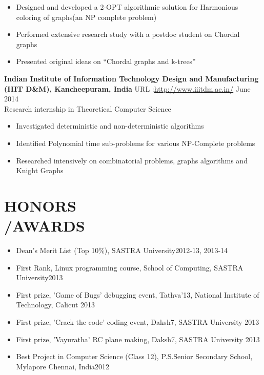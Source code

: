 \documentclass[margin, 10pt]{res} %
\begin{document}
\begin{resume}
{{{\begin{itemize}
\item Designed and developed a 2-OPT algorithmic solution for Harmonious coloring of graphs(an NP complete problem)
\item Performed extensive research study with a postdoc student on Chordal graphs
\item Presented original ideas on ``Chordal graphs and k-trees''
\end{itemize}
{\textbf{Indian Institute of Information Technology Design and Manufacturing (IIIT D\&M), Kancheepuram, India}  URL :\url{http://www.iiitdm.ac.in/} \hfill June 2014 \\
Research internship in Theoretical Computer Science
\begin{itemize} \itemsep -2pt %
\item Investigated deterministic and non-deterministic algorithms
\item Identified Polynomial time sub-problems for various NP-Complete problems
\item Researched intensively on combinatorial problems, graphs algorithms and Knight Graphs
\end{itemize}

\section{HONORS\\/AWARDS}
\begin{itemize}\itemsep -2pt
\item Dean's Merit List (Top 10\%), SASTRA University\hfill 2012-13, 2013-14
\item First Rank, Linux programming course, School of Computing, SASTRA University\hfill 2013
\item First prize, 'Game of Bugs' debugging event, Tathva'13, National Institute of Technology, Calicut \hfill 2013
\item First prize, 'Crack the code' coding event, Daksh7, SASTRA University \hfill 2013
\item First prize, 'Vayuratha' RC plane making, Daksh7, SASTRA University \hfill 2013
\item Best Project in Computer Science (Class 12), P.S.Senior Secondary School, Mylapore Chennai, India\hfill 2012


\end{itemize}}}}}
\end{resume}
\end{document}
